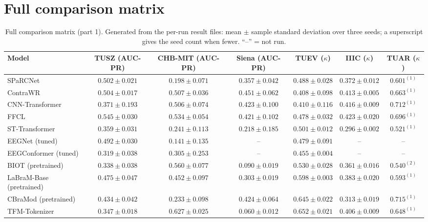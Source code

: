 \section{Full comparison matrix}
\label{app:matrix}

\begin{table}[h]
\centering
\scriptsize
\caption{Full comparison matrix (part 1). Generated from the per-run result files: mean $\pm$ sample standard deviation over three seeds; a superscript gives the seed count when fewer. ``--'' = not run.}
\begin{tabular}{lcccccc}
\toprule
Model & TUSZ (AUC-PR) & CHB-MIT (AUC-PR) & Siena (AUC-PR) & TUEV ($\kappa$) & IIIC ($\kappa$) & TUAR ($\kappa$) \\
\midrule
SPaRCNet & $0.502 \pm 0.021$ & $0.198 \pm 0.071$ & $0.357 \pm 0.042$ & $0.488 \pm 0.028$ & $0.372 \pm 0.012$ & $0.601^{(1)}$ \\
ContraWR & $0.504 \pm 0.017$ & $0.507 \pm 0.036$ & $0.451 \pm 0.062$ & $0.408 \pm 0.098$ & $0.413 \pm 0.005$ & $0.663^{(1)}$ \\
CNN-Transformer & $0.371 \pm 0.193$ & $0.506 \pm 0.074$ & $0.423 \pm 0.100$ & $0.410 \pm 0.116$ & $0.416 \pm 0.009$ & $0.712^{(1)}$ \\
FFCL & $0.545 \pm 0.030$ & $0.534 \pm 0.054$ & $0.421 \pm 0.102$ & $0.478 \pm 0.032$ & $0.423 \pm 0.020$ & $0.696^{(1)}$ \\
ST-Transformer & $0.359 \pm 0.031$ & $0.241 \pm 0.113$ & $0.218 \pm 0.185$ & $0.501 \pm 0.012$ & $0.296 \pm 0.002$ & $0.521^{(1)}$ \\
EEGNet (tuned) & $0.492 \pm 0.030$ & $0.141 \pm 0.135$ & -- & $0.479 \pm 0.091$ & -- & -- \\
EEGConformer (tuned) & $0.319 \pm 0.038$ & $0.305 \pm 0.253$ & -- & $0.455 \pm 0.004$ & -- & -- \\
BIOT (pretrained) & $0.338 \pm 0.038$ & $0.560 \pm 0.077$ & $0.090 \pm 0.019$ & $0.530 \pm 0.028$ & $0.361 \pm 0.016$ & $0.540^{(2)}$ \\
LaBraM-Base (pretrained) & $0.475 \pm 0.047$ & $0.452 \pm 0.097$ & $0.303 \pm 0.019$ & $0.598 \pm 0.003$ & $0.383 \pm 0.020$ & $0.593^{(1)}$ \\
CBraMod (pretrained) & $0.434 \pm 0.042$ & $0.233 \pm 0.098$ & $0.424 \pm 0.064$ & $0.645 \pm 0.022$ & $0.313 \pm 0.019$ & $0.715^{(1)}$ \\
TFM-Tokenizer & $0.347 \pm 0.018$ & $0.627 \pm 0.025$ & $0.060 \pm 0.012$ & $0.652 \pm 0.021$ & $0.406 \pm 0.009$ & $0.648^{(1)}$ \\

\end{tabular}
\end{table}
